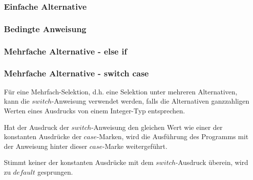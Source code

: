 		\begin{minipage}[t]{5.5 cm}
			\subsubsection{Einfache Alternative}
				
		\end{minipage}
		\begin{minipage}[t]{5.5 cm}
			\subsubsection{Bedingte Anweisung}
				
		\end{minipage}
		\begin{minipage}[t]{7 cm}
			\subsubsection{Mehrfache Alternative - else if}
				
		\end{minipage}
		
\newpage%
	
		\subsubsection{Mehrfache Alternative - switch case}
			\begin{minipage}[t]{9 cm}
				
				\begin{compactitem}
					\item Für eine Mehrfach-Selektion, d.h. eine Selektion unter mehreren Alternativen, kann die $switch$-Anweisung verwendet werden, falls die Alternativen ganzzahligen Werten eines Ausdrucks von einem Integer-Typ entsprechen.
					\item Hat der Ausdruck der $switch$-Anweisung den gleichen Wert wie einer der konstanten Ausdrücke der $case$-Marken, wird die Ausführung des Programms mit der Anweisung hinter dieser $case$-Marke weitergeführt.
					\item Stimmt keiner der konstanten Ausdrücke mit dem $switch$-Ausdruck überein, wird zu $default$ gesprungen.
				\end{compactitem}							
			\end{minipage}
			\hspace*{1cm}
			\begin{minipage}[t]{9 cm}
				\vspace*{-0.5cm}
				
			\end{minipage}
		
